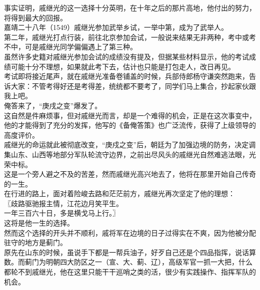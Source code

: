 \begin{multicols}{\theparacolNo}
事实证明，戚继光的这一选择十分英明，在十年之后的那片高地，他付出的努力，将得到最大的回报。\\

嘉靖二十八年（1549）戚继光参加武举乡试，一举中第，成为了武举人。\\

第二年，戚继光打点行装，前往北京参加会试，一般说来结果无非两种，考中或考不中，可是戚继光同学偏偏遇上了第三种。\\

虽然许多史籍对戚继光参加会试的成绩没有提及，但据某些材料显示，他的考试成绩可能十分不理想，如果就此考下去，估计也只能是打包走人，改日再见。\\

考试即将接近尾声，就在戚继光准备卷铺盖的时候，兵部侍郎杨守谦突然跑来，告诉大家：不管考得好还是考得差，统统都不要考了，同学们马上集合，抄起家伙跟我上吧。\\

俺答来了，“庚戌之变”爆发了。\\

这自然是件麻烦事，但对戚继光而言，却是一个难得的机会，正是在这次事变中，他的才能得到了充分的发挥，他写的《备俺答策》也广泛流传，获得了上级领导的高度评价。\\

戚继光的命运就此被彻底改变，“庚戍之变”后，朝廷为了加强边境的防务，决定调集山东、山西等地部分军队轮流守边界，之前出尽风头的戚继光自然难逃法眼，光荣中标。\\

这是一个旁人避之不及的苦差，然而戚继光高兴地去了，他将在那里开始自己传奇的一生。\\

在行进的路上，面对着险峻去路和茫茫前方，戚继光再次坚定了他的理想：\\

〖歧路驱驰报主情，江花边月笑平生。\\

一年三百六十日，多是横戈马上行。〗\\

这将是他一生的选择。\\

然而这个选择的开头并不顺利，戚将军在边境的日子过得实在不爽，因为他被分配驻守的地方是蓟门。\\

原先在山东的时候，虽说手下都是一帮兵油子，好歹自己还是个四品指挥，说话算数。而蓟门为明朝四大防区之一（宣、大、蓟、辽），高级军官一抓一大把，什么都轮不到戚继光，他在这里只能干干巡哨之类的活，很少有实践操作、指挥军队的机会。\\


\end{multicols}
